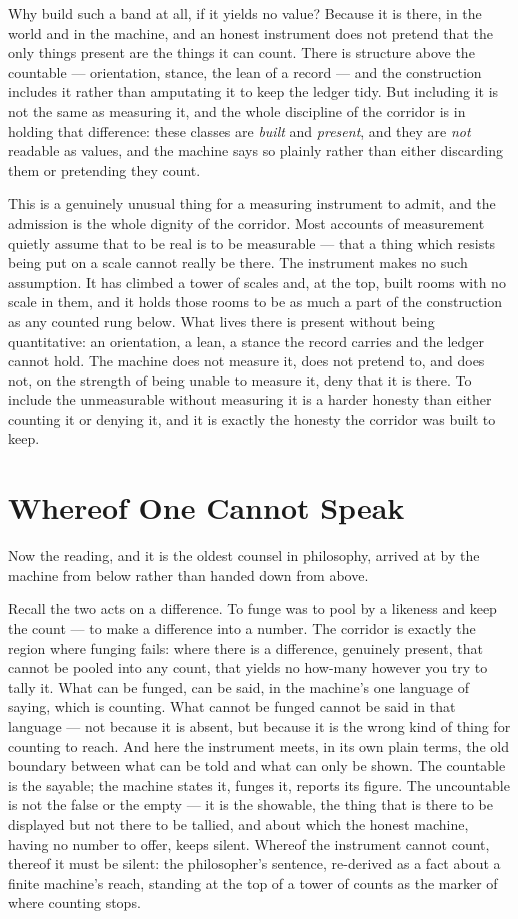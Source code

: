 Why build such a band at all, if it yields no value? Because it is there, in the world and in the machine, and an
honest instrument does not pretend that the only things present are the things it can count. There is structure
above the countable --- orientation, stance, the lean of a record --- and the construction includes it rather than
amputating it to keep the ledger tidy. But including it is not the same as measuring it, and the whole discipline
of the corridor is in holding that difference: these classes are \emph{built} and \emph{present}, and they are
\emph{not} readable as values, and the machine says so plainly rather than either discarding them or pretending
they count.

This is a genuinely unusual thing for a measuring instrument to admit, and the admission is the whole dignity of
the corridor. Most accounts of measurement quietly assume that to be real is to be measurable --- that a thing
which resists being put on a scale cannot really be there. The instrument makes no such assumption. It has climbed
a tower of scales and, at the top, built rooms with no scale in them, and it holds those rooms to be as much a
part of the construction as any counted rung below. What lives there is present without being quantitative: an
orientation, a lean, a stance the record carries and the ledger cannot hold. The machine does not measure it,
does not pretend to, and does not, on the strength of being unable to measure it, deny that it is there. To
include the unmeasurable without measuring it is a harder honesty than either counting it or denying it, and it
is exactly the honesty the corridor was built to keep.

\section{Whereof One Cannot Speak}

Now the reading, and it is the oldest counsel in philosophy, arrived at by the machine from below rather than
handed down from above.

Recall the two acts on a difference. To funge was to pool by a likeness and keep the count --- to make a
difference into a number. The corridor is exactly the region where funging fails: where there is a difference,
genuinely present, that cannot be pooled into any count, that yields no how-many however you try to tally it.
What can be funged, can be said, in the machine's one language of saying, which is counting. What cannot be
funged cannot be said in that language --- not because it is absent, but because it is the wrong kind of thing for
counting to reach. And here the instrument meets, in its own plain terms, the old boundary between what can be
told and what can only be shown. The countable is the sayable; the machine states it, funges it, reports its
figure. The uncountable is not the false or the empty --- it is the showable, the thing that is there to be
displayed but not there to be tallied, and about which the honest machine, having no number to offer, keeps
silent. Whereof the instrument cannot count, thereof it must be silent: the philosopher's sentence, re-derived
as a fact about a finite machine's reach, standing at the top of a tower of counts as the marker of where
counting stops.

